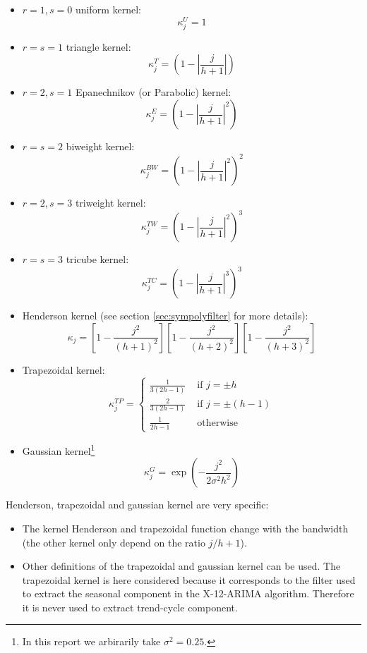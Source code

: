 \documentclass[
  12pt,
  ,
  a4paper]{article}
\newcommand\1{\mathds{1}}
\begin{document}
\newpage

\begin{multicols}{2}
\begin{itemize}
\item $r=1,s=0$ uniform kernel: 
$$\kappa_j^U=1$$
\item $r=s=1$ triangle kernel:
$$\kappa_j^T=\left(
  1-
  \left\lvert
  \frac j {h+1}
  \right\lvert
\right)$$

\item $r=2,s=1$  Epanechnikov (or Parabolic) kernel:
$$\kappa_j^E=\left(
  1-
  \left\lvert
  \frac j {h+1}
  \right\lvert^2
\right)$$

\item $r=s=2$ biweight kernel:
$$\kappa_j^{BW}=\left(
  1-
  \left\lvert
  \frac j {h+1}
  \right\lvert^2
\right)^2$$

\item $r = 2, s = 3$ triweight kernel:
$$\kappa_j^{TW}=\left(
  1-
  \left\lvert
  \frac j {h+1}
  \right\lvert^2
\right)^3$$

\item $r = s = 3$ tricube kernel:
$$\kappa_j^{TC}=\left(
  1-
  \left\lvert
  \frac j {h+1}
  \right\lvert^3
\right)^3$$

\item Henderson kernel (see section \ref{sec:sympolyfilter} for more details):
$$
\kappa_{j}=\left[1-\frac{j^2}{(h+1)^2}\right]
\left[1-\frac{j^2}{(h+2)^2}\right]
\left[1-\frac{j^2}{(h+3)^2}\right]
$$
\item Trapezoidal kernel:
$$
\kappa_j^{TP}=
\begin{cases}
  \frac{1}{3(2h-1)} & \text{ if }j=\pm h 
  \\
  \frac{2}{3(2h-1)} & \text{ if }j=\pm (h-1)\\
  \frac{1}{2h-1}& \text{ otherwise}
\end{cases}
$$
\item Gaussian kernel\footnote{
In this report we arbirarily take $\sigma^2=0.25$.
}
$$
\kappa_j^G=\exp\left(
-\frac{
  j^2
}{
  2\sigma^2h^2
}\right)
$$
\end{itemize}
\end{multicols}

Henderson, trapezoidal and gaussian kernel are very specific:

\begin{itemize}
\item
  The kernel Henderson and trapezoidal function change with the bandwidth (the other kernel only depend on the ratio \(j/h+1\)).
\item
  Other definitions of the trapezoidal and gaussian kernel can be used.
  The trapezoidal kernel is here considered because it corresponds to the filter used to extract the seasonal component in the X-12-ARIMA algorithm.
  Therefore it is never used to extract trend-cycle component.
\end{itemize}
\end{document}
